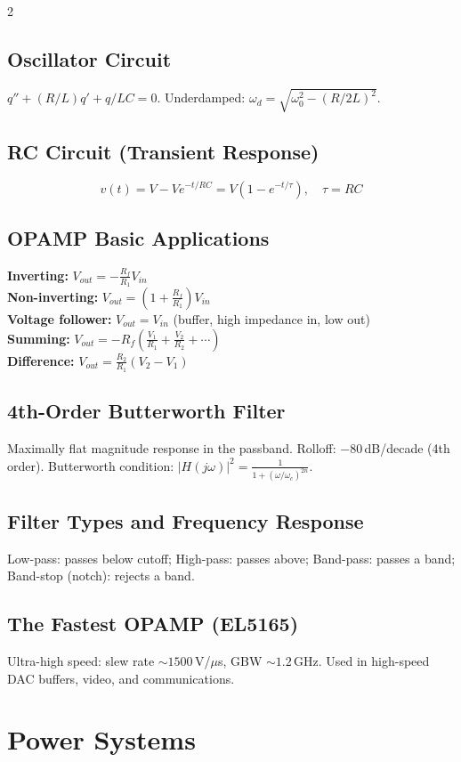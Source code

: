 \documentclass[10pt,a4paper]{article}
\begin{document}
\begin{multicols}{2}
\subsection{Oscillator Circuit}
$q'' + (R/L)q' + q/LC = 0$. Underdamped: $\omega_d = \sqrt{\omega_0^2 - (R/2L)^2}$.

\subsection{RC Circuit (Transient Response)}
\[
v(t) = V - Ve^{-t/RC} = V(1 - e^{-t/\tau}), \quad \tau = RC
\]

\subsection{OPAMP Basic Applications}
\textbf{Inverting:} $V_{out} = -\frac{R_f}{R_1}V_{in}$\\
\textbf{Non-inverting:} $V_{out} = \left(1 + \frac{R_f}{R_1}\right)V_{in}$\\
\textbf{Voltage follower:} $V_{out} = V_{in}$ (buffer, high impedance in, low out)\\
\textbf{Summing:} $V_{out} = -R_f\!\left(\frac{V_1}{R_1}+\frac{V_2}{R_2}+\cdots\right)$\\
\textbf{Difference:} $V_{out} = \frac{R_2}{R_1}(V_2 - V_1)$

\subsection{4th-Order Butterworth Filter}
Maximally flat magnitude response in the passband. Rolloff: $-80$\,dB/decade (4th order). Butterworth condition: $|H(j\omega)|^2 = \frac{1}{1+(\omega/\omega_c)^{2n}}$.

\subsection{Filter Types and Frequency Response}
Low-pass: passes below cutoff; High-pass: passes above; Band-pass: passes a band; Band-stop (notch): rejects a band.

\subsection{The Fastest OPAMP (EL5165)}
Ultra-high speed: slew rate $\sim 1500$\,V/$\mu$s, GBW $\sim 1.2$\,GHz. Used in high-speed DAC buffers, video, and communications.

\section{Power Systems}


\end{multicols}
\end{document}
